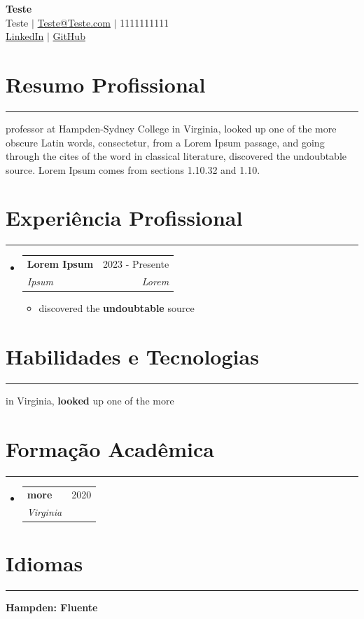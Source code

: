\documentclass[a4paper,10pt]{article}
\makeatletter
\newcommand{\sectionrule}{\vspace{-4pt}\hrule\vspace{5pt}}
\newcommand{\resumeItem}[1]{\item \small #1}
\newcommand{\resumeSubheading}[4]{\item \begin{tabular*}{\textwidth}[t]{l@{\extracolsep{\fill}}r} \textbf{#1} & #3 \\ \textit{\small #2} & \textit{\small #4} \end{tabular*}\vspace{-6pt}}
\makeatother
\begin{document}
\begin{center}
    {\Huge \textbf{Teste}} \\[5pt]
    \small Teste $|$ \href{mailto:Teste@Teste.com}{Teste@Teste.com} $|$ 1111111111 \\
    \href{Teste.com/Teste}{LinkedIn} $|$ \href{Teste.com/Teste}{GitHub}
\end{center}

\section{Resumo Profissional} \sectionrule
professor at Hampden-Sydney College in Virginia, looked up one of the more obscure Latin words, consectetur, from a Lorem Ipsum passage, and going through the cites of the word in classical literature, discovered the undoubtable source. Lorem Ipsum comes from sections 1.10.32 and 1.10.

\section{Experiência Profissional} \sectionrule
\begin{itemize}[leftmargin=0pt, label={}]
\resumeSubheading{Lorem Ipsum}{Ipsum}{2023 - Presente}{Lorem}
\begin{itemize}[leftmargin=12pt, label=\textbullet, itemsep=1pt, parsep=1pt]
  \resumeItem{discovered the \textbf{undoubtable} source}
\end{itemize}

\end{itemize}

\section{Habilidades e Tecnologias} \sectionrule
\begin{description}[leftmargin=0pt, font=\bfseries, itemsep=-2pt]
\item[College:] in Virginia, \textbf{looked} up one of the more
\end{description}

\section{Formação Acadêmica} \sectionrule
\begin{itemize}[leftmargin=0pt, label={}]
\resumeSubheading{more}{Virginia}{2020}{}
\end{itemize}

\section{Idiomas} \sectionrule
\textbf{Hampden: Fluente}
\end{document}

